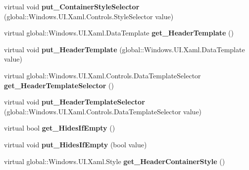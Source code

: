 \begin{DoxyCompactItemize}
virtual void {\bfseries put\+\_\+\+Container\+Style\+Selector} (global\+::\+Windows.\+U\+I.\+Xaml.\+Controls.\+Style\+Selector value)
\item 
\mbox{\label{class_windows_1_1_u_i_1_1_xaml_1_1_controls_1_1_group_style_af2b42ad3678973b6c5ffc2da772855d9}} 
virtual global\+::\+Windows.\+U\+I.\+Xaml.\+Data\+Template {\bfseries get\+\_\+\+Header\+Template} ()
\item 
\mbox{\label{class_windows_1_1_u_i_1_1_xaml_1_1_controls_1_1_group_style_abe3e5ea2a3be2465b15f097703102cd2}} 
virtual void {\bfseries put\+\_\+\+Header\+Template} (global\+::\+Windows.\+U\+I.\+Xaml.\+Data\+Template value)
\item 
\mbox{\label{class_windows_1_1_u_i_1_1_xaml_1_1_controls_1_1_group_style_a146db53a3fc94e4e3c9433f3c199f1ff}} 
virtual global\+::\+Windows.\+U\+I.\+Xaml.\+Controls.\+Data\+Template\+Selector {\bfseries get\+\_\+\+Header\+Template\+Selector} ()
\item 
\mbox{\label{class_windows_1_1_u_i_1_1_xaml_1_1_controls_1_1_group_style_a3b0221f01ff571dde0bf2c5bd0eeca2d}} 
virtual void {\bfseries put\+\_\+\+Header\+Template\+Selector} (global\+::\+Windows.\+U\+I.\+Xaml.\+Controls.\+Data\+Template\+Selector value)
\item 
\mbox{\label{class_windows_1_1_u_i_1_1_xaml_1_1_controls_1_1_group_style_a3b73f89d90026b986f6e55bc0566aedf}} 
virtual bool {\bfseries get\+\_\+\+Hides\+If\+Empty} ()
\item 
\mbox{\label{class_windows_1_1_u_i_1_1_xaml_1_1_controls_1_1_group_style_aa40a04f641abe85a825e92cf3eb7b442}} 
virtual void {\bfseries put\+\_\+\+Hides\+If\+Empty} (bool value)
\item 
\mbox{\label{class_windows_1_1_u_i_1_1_xaml_1_1_controls_1_1_group_style_a3c12aa3cefaa3b60dc882ca5393ec88f}} 
virtual global\+::\+Windows.\+U\+I.\+Xaml.\+Style {\bfseries get\+\_\+\+Header\+Container\+Style} ()

\end{DoxyCompactItemize}
